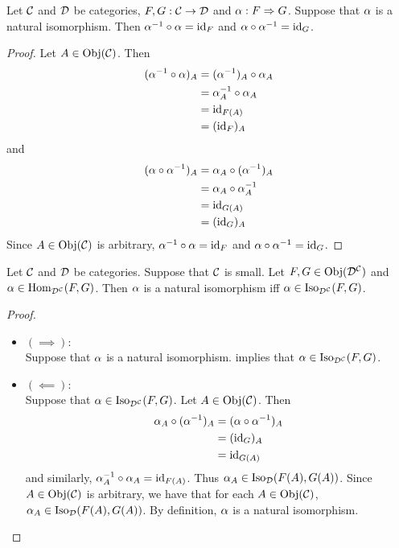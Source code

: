 \documentclass{book}
\begin{document}
	\begin{ex} 
		Let $\mathcal{C}$ and $\mathcal{D}$ be categories, $F,G: \mathcal{C} \rightarrow \mathcal{D}$ and $\alpha : F \Rightarrow G$. Suppose that $\alpha$ is a natural isomorphism. Then $\alpha^{-1} \circ \alpha = \operatorname{id}_F$ and $\alpha \circ \alpha^{-1} = \operatorname{id}_G$.
	\end{ex}
	
	\begin{proof}
		Let $A \in \operatorname{Obj}(\mathcal{C})$. Then 
		\begin{align*}
			(\alpha^{-1} \circ \alpha )_A 
			& = (\alpha^{-1})_A \circ \alpha_A \\
			& = \alpha_A^{-1} \circ \alpha_A \\
			& = \operatorname{id}_{F(A)} \\
			& = (\operatorname{id}_F)_A
		\end{align*}
		and 
		\begin{align*}
			(\alpha \circ \alpha^{-1} )_A 
			& = \alpha_A \circ (\alpha^{-1})_A\\
			& = \alpha_A \circ \alpha_A^{-1}\\
			& = \operatorname{id}_{G(A)} \\
			& = (\operatorname{id}_G)_A
		\end{align*}
		Since $A \in \operatorname{Obj}(\mathcal{C})$ is arbitrary, $\alpha^{-1} \circ \alpha = \operatorname{id}_F$ and $\alpha \circ \alpha^{-1} = \operatorname{id}_G$.
	\end{proof}
	
	\begin{ex} 
		Let $\mathcal{C}$ and $\mathcal{D}$ be categories. Suppose that $\mathcal{C}$ is small. Let $F,G \in \operatorname{Obj}(\mathcal{D}^{\mathcal{C}})$ and $\alpha \in \operatorname{Hom}_{\mathcal{D}^{\mathcal{C}}}(F, G)$. Then $\alpha$ is a natural isomorphism iff $\alpha \in \operatorname{Iso}_{\mathcal{D}^{\mathcal{C}}}(F, G)$. 
	\end{ex}
	
	\begin{proof}\
		\begin{itemize}
			\item $(\implies)$: \\
			Suppose that $\alpha$ is a natural isomorphism.  implies that $\alpha \in \operatorname{Iso}_{\mathcal{D}^{\mathcal{C}}}(F, G)$. 
			\item $(\impliedby)$: \\
			Suppose that $\alpha \in \operatorname{Iso}_{\mathcal{D}^{\mathcal{C}}}(F, G)$. Let $A \in \operatorname{Obj}(\mathcal{C})$. Then 
			\begin{align*}
				\alpha_A \circ (\alpha^{-1})_A
				& = (\alpha \circ \alpha^{-1})_A \\
				& = (\operatorname{id}_{G})_A \\
				& = \operatorname{id}_{G(A)} \\
			\end{align*}
			and similarly, $\alpha_A^{-1} \circ \alpha_A = \operatorname{id}_{F(A)}$. Thus $\alpha_A \in \operatorname{Iso}_{\mathcal{D}}(F(A), G(A))$. Since $A \in \operatorname{Obj}(\mathcal{C})$ is arbitrary, we have that for each $A \in \operatorname{Obj}(\mathcal{C})$, $\alpha_A \in \operatorname{Iso}_{\mathcal{D}}(F(A), G(A))$. By definition, $\alpha$ is a natural isomorphism.
		\end{itemize}
	\end{proof}
	
\end{document}
